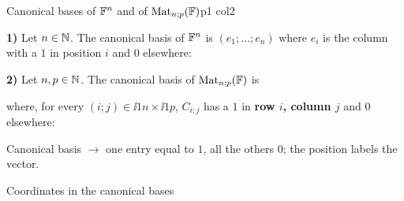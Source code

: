 \documentclass[course,noautoquant,noautokw]{neyvia-study}
\begin{document}
\begin{concept}[1.18]{Canonical bases of $\mathbb{F}^n$ and of $\operatorname{Mat}_{n;p}(\mathbb{F})$}{p1 col2}
\begin{definition}
\noindent \textbf{1)} Let $n\in\mathbb{N}$. The canonical basis of $\mathbb{F}^n$ is $(e_1;\dots;e_n)$ where $e_i$ is the column with a $1$ in position $i$ and $0$ elsewhere:
\par\noindent \textbf{2)} Let $n,p\in\mathbb{N}$. The canonical basis of $\operatorname{Mat}_{n;p}(\mathbb{F})$ is
\par\noindent where, for every $(i;j)\in\ii{1}{n}\times\ii{1}{p}$, $C_{i;j}$ has a $1$ in \textbf{row $i$, column $j$} and $0$ elsewhere:
\end{definition}
\begin{reflex}
Canonical basis \ensuremath{\rightarrow} one entry equal to $1$, all the others $0$; the position labels the vector.
\end{reflex}
\begin{worked}{Coordinates in the canonical bases}

\end{worked}
\end{concept}
\end{document}
